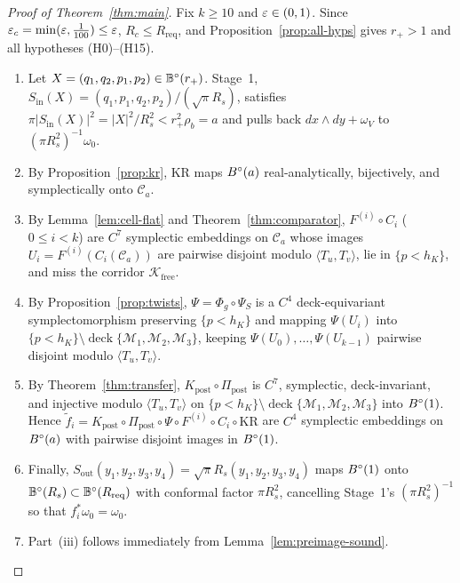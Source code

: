 \begin{proof}[Proof of Theorem~\ref{thm:main}]
Fix $k\ge10$ and $\varepsilon\in(0,1)$. Since $\varepsilon_c=\min(\varepsilon,\frac1{100})\le\varepsilon$, $R_c\le R_{\mathrm{req}}$, and
Proposition~\ref{prop:all-hyps} gives $r_+>1$ and all hypotheses (H0)--(H15).
\begin{enumerate}[label=(\arabic*)]
\item Let $X=(q_1,q_2,p_1,p_2)\in\mathbb{B}^{\circ}(r_+)$. Stage~1, $S_{\mathrm{in}}(X)=(q_1,p_1,q_2,p_2)/(\sqrt\pi R_s)$,
satisfies $\pi|S_{\mathrm{in}}(X)|^2=|X|^2/R_s^2<r_+^2\rho_b=a$ and pulls back $dx\wedge dy+\omega_V$ to
$(\pi R_s^2)^{-1}\omega_0$.
\item By Proposition~\ref{prop:kr}, $\mathrm{KR}$ maps $B^{\circ}(a)$ real-analytically, bijectively, and symplectically onto
$\mathcal C_a$.
\item By Lemma~\ref{lem:cell-flat} and Theorem~\ref{thm:comparator}, $F^{(i)}\circ C_i$ ($0\le i<k$) are $C^7$
symplectic embeddings on $\mathcal C_a$ whose images $U_i=F^{(i)}(C_i(\mathcal C_a))$ are pairwise disjoint modulo
$\langle T_u,T_v\rangle$, lie in $\{p<h_K\}$, and miss the corridor $\mathcal K_{\mathrm{free}}$.
\item By Proposition~\ref{prop:twists}, $\Psi=\Phi_g\circ\Psi_S$ is a $C^4$ deck-equivariant symplectomorphism preserving
$\{p<h_K\}$ and mapping $\Psi(U_i)$ into $\{p<h_K\}\setminus\operatorname{deck}\{\mathcal M_1,\mathcal M_2,\mathcal M_3\}$,
keeping $\Psi(U_0),\dots,\Psi(U_{k-1})$ pairwise disjoint modulo $\langle T_u,T_v\rangle$.
\item By Theorem~\ref{thm:transfer}, $K_{\mathrm{post}}\circ\Pi_{\mathrm{post}}$ is $C^7$, symplectic, deck-invariant,
and injective modulo $\langle T_u,T_v\rangle$ on $\{p<h_K\}\setminus\operatorname{deck}\{\mathcal M_1,\mathcal M_2,\mathcal M_3\}$
into $B^{\circ}(1)$. Hence $\tilde f_i=K_{\mathrm{post}}\circ\Pi_{\mathrm{post}}\circ\Psi\circ F^{(i)}\circ C_i\circ\mathrm{KR}$
are $C^4$ symplectic embeddings on $B^{\circ}(a)$ with pairwise disjoint images in $B^{\circ}(1)$.
\item Finally, $S_{\mathrm{out}}(y_1,y_2,y_3,y_4)=\sqrt\pi R_s(y_1,y_2,y_3,y_4)$ maps $B^{\circ}(1)$ onto $\mathbb{B}^{\circ}(R_s)\subset\mathbb{B}^{\circ}(R_{\mathrm{req}})$
with conformal factor $\pi R_s^2$, cancelling Stage~1's $(\pi R_s^2)^{-1}$ so that $f_i^*\omega_0=\omega_0$.
\item Part~(iii) follows immediately from Lemma~\ref{lem:preimage-sound}.\qedhere
\end{enumerate}
\end{proof}

